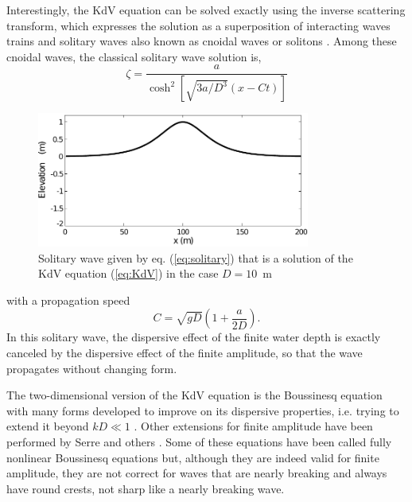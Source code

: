 Interestingly, the KdV equation can be solved exactly using the inverse scattering transform, which expresses the solution 
as a superposition of interacting waves trains and solitary waves also known as cnoidal waves or solitons \citep{Osborne&al.1996}. 
Among these cnoidal waves, the classical solitary wave solution is, 
\begin{equation}
    \zeta=\frac{a}{ \cosh^2\left[\sqrt{ 3a / D^3}\left(x-Ct\right)\right]} \label{eq:solitary}
\end{equation}
\begin{figure}
\centerline{\includegraphics[width=0.8\textwidth]{FIGS_CH_SURF/soliton.pdf}}
  \caption{Solitary wave given by eq. (\ref{eq:solitary}) that is a solution of the KdV equation (\ref{eq:KdV}) in the case  $D=10$~m}
\label{soliton}
\end{figure}
with a propagation speed 
\begin{equation}
C=\sqrt{gD} \left(1+\frac{a}{2D}\right). \label{eq:solitary_speed}
\end{equation}
In this solitary wave, the dispersive effect of the finite water depth is exactly 
canceled by the dispersive effect of the finite amplitude, so that the wave propagates without changing form. 

The two-dimensional version of the KdV equation is the Boussinesq equation with many forms developed to improve on its dispersive properties, i.e. 
trying to extend it beyond $kD \ll 1$ \citep{Nwogu1993,Nadaoka&al.1997}. Other extensions for finite amplitude have been performed by Serre and others
\citep{Lannes&Bonneton2009,Dias&Milewski2010}. Some of these equations have been called fully nonlinear Boussinesq equations but, although they 
are indeed valid for finite amplitude, they are not correct for waves that are nearly breaking and always have round crests, not sharp like a
nearly breaking wave. 

